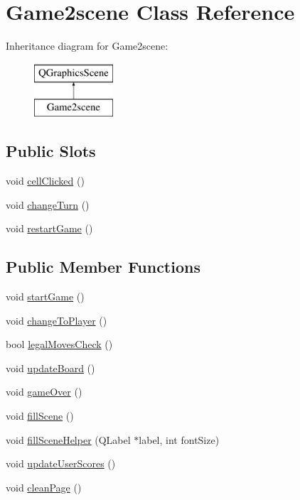 \hypertarget{classGame2scene}{\section{Game2scene Class Reference}
\label{classGame2scene}
}
Inheritance diagram for Game2scene\-:\begin{figure}[H]
\begin{center}
\leavevmode
\includegraphics[height=2.000000cm]{classGame2scene}
\end{center}
\end{figure}
\subsection*{Public Slots}
\begin{DoxyCompactItemize}
\item 
void \hyperlink{classGame2scene_a2721090205eb61711f1e0395984f93c0}{cell\-Clicked} ()
\item 
void \hyperlink{classGame2scene_ab2260f4670232d77bf1f24b2bc98c785}{change\-Turn} ()
\item 
void \hyperlink{classGame2scene_a0d79d8188020496d4af3bc67b5a56020}{restart\-Game} ()
\end{DoxyCompactItemize}
\subsection*{Public Member Functions}
\begin{DoxyCompactItemize}
\item 
void \hyperlink{classGame2scene_a18ee83d97ffb17df3d554f01c113ecd9}{start\-Game} ()
\item 
void \hyperlink{classGame2scene_a97e66e2641f6c77daba82b99c50056ac}{change\-To\-Player} ()
\item 
bool \hyperlink{classGame2scene_a2d603c8abf5eb9789b8fd160f1a339b2}{legal\-Moves\-Check} ()
\item 
void \hyperlink{classGame2scene_ad56cf11d5f9cf0159286885b8c3886f2}{update\-Board} ()
\item 
void \hyperlink{classGame2scene_aaedfb29d950f472dd031869e1974837a}{game\-Over} ()
\item 
void \hyperlink{classGame2scene_a844342045953eba83bac963b282e55a5}{fill\-Scene} ()
\item 
void \hyperlink{classGame2scene_af8d371d3e0d151a5535bae0e735c7dc3}{fill\-Scene\-Helper} (Q\-Label $\ast$label, int font\-Size)
\item 
void \hyperlink{classGame2scene_a6968b1e0acbc0054c43014b7a38400fd}{update\-User\-Scores} ()
\item 
void \hyperlink{classGame2scene_ae9990344a0346f2b594e4476fdb5e312}{clean\-Page} ()
\end{DoxyCompactItemize}
